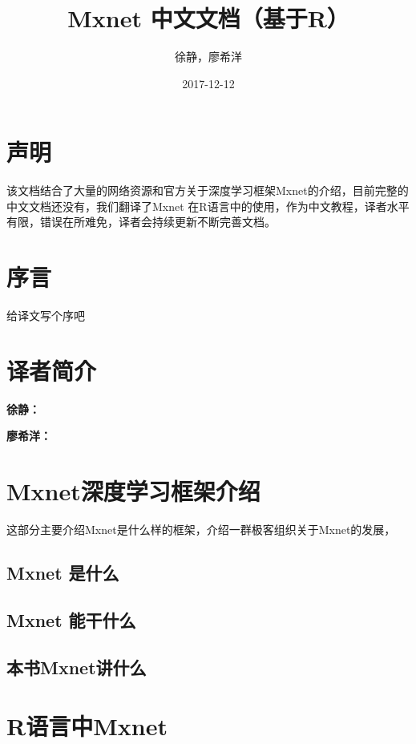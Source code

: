 \documentclass[]{book}
\title{Mxnet 中文文档（基于R）}
\author{徐静，廖希洋}
\date{2017-12-12}
\begin{document}
\maketitle

{
\setcounter{tocdepth}{1}
\tableofcontents
}
\chapter*{声明}

该文档结合了大量的网络资源和官方关于深度学习框架Mxnet的介绍，目前完整的中文文档还没有，我们翻译了Mxnet
在R语言中的使用，作为中文教程，译者水平有限，错误在所难免，译者会持续更新不断完善文档。

\chapter*{序言}

给译文写个序吧

\chapter*{译者简介}

\textbf{徐静：}

\textbf{廖希洋：}

\chapter{Mxnet深度学习框架介绍}\label{mxnet}

这部分主要介绍Mxnet是什么样的框架，介绍一群极客组织关于Mxnet的发展，

\section{Mxnet 是什么}\label{mxnet-}

\section{Mxnet 能干什么}\label{mxnet-}

\section{本书Mxnet讲什么}\label{mxnet}

\chapter{R语言中Mxnet}\label{rmxnet}
\end{document}
